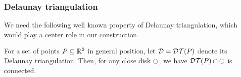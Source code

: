 \documentclass[12pt]{article}%
\begin{document}
\subsubsection{Delaunay triangulation}

We need the following well known property of Delaunay triangulation,
which would play a center role in our construction.

\begin{claim}
    For a set of points $P \subseteq \mathbb{R}^2$ in general position, let
    $\DT = \DTX{\PS}$ denote its Delaunay triangulation.  Then, for
    any close disk $\ocircle$, we have $\restrictY{\DTX{\PS}}{\disk}$ is
    connected.
\end{claim}
\end{document}
